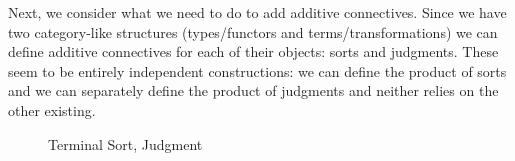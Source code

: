 \documentclass{article}
\begin{document}
Next, we consider what we need to do to add additive connectives.
%
Since we have two category-like structures (types/functors and
terms/transformations) we can define additive connectives for each of
their objects: sorts and judgments.
%
These seem to be entirely independent constructions: we can define the
product of sorts and we can separately define the product of judgments
and neither relies on the other existing.

\begin{figure}
  \caption{Terminal Sort, Judgment}
\end{figure}
\end{document}
